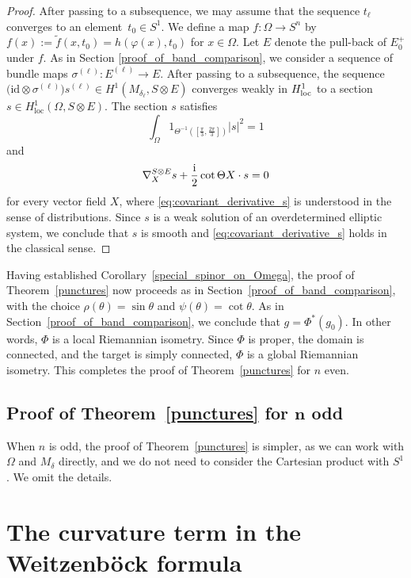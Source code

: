 \documentclass[pdftex]{sigma}
\numberwithin{equation}{section}
\newcommand{\id}{\mathrm{id}}
\begin{document}
\begin{proof}
After passing to a subsequence, we may assume that the sequence $t_\ell$ converges to an element~${t_0 \in S^1}$. We define a map $f\colon \Omega \to S^n$ by $f(x) := \tilde{f}(x,t_0) = h(\varphi(x),t_0)$ for $x \in \Omega$.
Let $E$ denote the pull-back of $E_0^+$ under $f$.
As in Section \ref{proof_of_band_comparison}, we consider a sequence of bundle maps $\sigma^{(\ell)}\colon E^{(\ell)} \to E$. After passing to a subsequence, the sequence $\big(\id \otimes \sigma^{(\ell)}\big) s^{(\ell)} \in H^1(M_{\delta_\ell},S \otimes E)$ converges weakly in $H_{\text{\rm loc}}^1$ to a section $s \in H_{\mathrm{loc}}^1(\Omega,S \otimes E)$. The section $s$ satisfies
\[\int_\Omega 1_{\Theta^{-1}([\frac{\pi}{3},\frac{2\pi}{3}])} |s|^2 = 1\]
and
\begin{equation}
\nabla_X^{S \otimes E} s + \frac{\rm i}{2} \cot \Theta X \cdot s = 0
\label{eq:covariant_derivative_s}
\end{equation}
for every vector field $X$, where \eqref{eq:covariant_derivative_s} is understood in the sense of distributions. Since $s$ is a weak solution of an overdetermined elliptic system, we conclude that $s$ is smooth and \eqref{eq:covariant_derivative_s} holds in the classical sense.
\end{proof}

Having established Corollary~\ref{special_spinor_on_Omega}, the proof of Theorem~\ref{punctures} now proceeds as in Section~\ref{proof_of_band_comparison}, with the choice $\rho(\theta) = \sin \theta$ and $\psi(\theta) = \cot \theta$.
As in Section~\ref{proof_of_band_comparison}, we conclude that $g = \Phi^*(g_0)$.
In other words, $\Phi$ is a local Riemannian isometry.
Since $\Phi$ is proper, the domain is connected, and the target is simply connected, $\Phi$ is a global Riemannian isometry.
This completes the proof of Theorem~\ref{punctures} for $n$ even.

\subsection[Proof of Theorem~\ref{punctures} for n odd]{Proof of Theorem~\ref{punctures} for $\boldsymbol{n}$ odd}

When $n$ is odd, the proof of Theorem~\ref{punctures} is simpler, as we can work with $\Omega$ and $M_\delta$ directly, and we do not need to consider the Cartesian product with $S^1$. We omit the details.

\appendix

\appendix
\section{The curvature term in the Weitzenb\"ock formula}\label{appendix:Weitzen}
\end{document}
